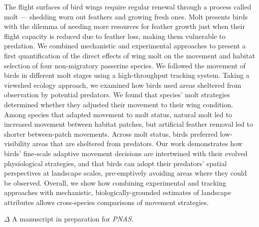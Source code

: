 \small{
    The flight surfaces of bird wings require regular renewal through a process called molt --- shedding worn out feathers and growing fresh ones.
    Molt presents birds with the dilemma of needing more resources for feather growth just when their flight capacity is reduced due to feather loss, making them vulnerable to predation.
    We combined mechanistic and experimental approaches to present a first quantification of the direct effects of wing molt on the movement and habitat selection of four non-migratory passerine species. 
    We followed the movement of birds in different molt stages using a high-throughput tracking system. 
    Taking a viewshed ecology approach, we examined how birds used areas sheltered from observation by potential predators.
    We found that species' molt strategies determined whether they adjusted their movement to their wing condition. 
    Among species that adapted movement to molt status, natural molt led to increased movement between habitat patches, but artificial feather removal led to shorter between-patch movements. 
    Across molt status, birds preferred low-visibility areas that are sheltered from predators.
    Our work demonstrates how birds' fine-scale adaptive movement decisions are intertwined with their evolved physiological strategies, and that birds can adopt their predators' spatial perspectives at landscape scales, pre-emptively avoiding areas where they could be observed.
    Overall, we show how combining experimental and tracking approaches with mechanistic, biologically-grounded estimates of landscape attributes allows cross-species comparisons of movement strategies.

    \bigskip

    {\noindent \large{$\Delta$}} \normalfont A manuscript in preparation for \textit{PNAS}.

}

\clearpage
